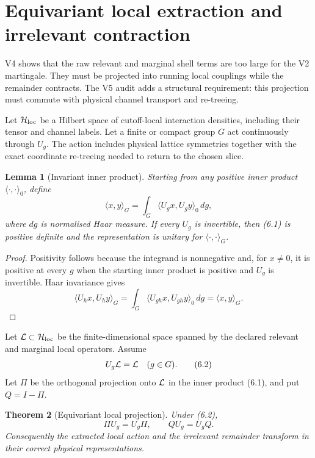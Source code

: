 \documentclass[11pt]{article}
\newtheorem{theorem}{Theorem}[section]
\newtheorem{lemma}[theorem]{Lemma}
\theoremstyle{remark}
\begin{document}
\section{Equivariant local extraction and irrelevant contraction}
\label{sec:v12v6}

V4 shows that the raw relevant and marginal shell terms are too large
for the V2 martingale.  They must be projected into running local
couplings while the remainder contracts.  The V5 audit adds a
structural requirement: this projection must commute with physical
channel transport and re-treeing.

Let \({\cal H}_{\rm loc}\) be a Hilbert space of cutoff-local
interaction densities, including their tensor and channel labels.
Let a finite or compact group \(G\) act continuously through
\(U_g\).  The action includes physical lattice symmetries together
with the exact coordinate re-treeing needed to return to the chosen
slice.

\begin{lemma}[Invariant inner product]
\label{lem:v12v6-average}
Starting from any positive inner product
\(\langle\cdot,\cdot\rangle_0\), define
\[
 \langle x,y\rangle_G
 =\int_G\langle U_gx,U_gy\rangle_0\,dg,                     \tag{6.1}
\]
where \(dg\) is normalised Haar measure.  If every \(U_g\) is
invertible, then (6.1) is positive definite and the representation is
unitary for \(\langle\cdot,\cdot\rangle_G\).
\end{lemma}

\begin{proof}
Positivity follows because the integrand is nonnegative and, for
\(x\ne0\), it is positive at every \(g\) when the starting inner
product is positive and \(U_g\) is invertible.  Haar invariance gives
\[
 \langle U_hx,U_hy\rangle_G
 =\int_G\langle U_{gh}x,U_{gh}y\rangle_0\,dg
 =\langle x,y\rangle_G.
\]
\end{proof}

Let \({\cal L}\subset{\cal H}_{\rm loc}\) be the finite-dimensional
space spanned by the declared relevant and marginal local operators.
Assume
\[
                              U_g{\cal L}={\cal L}
                         \quad(g\in G).                      \tag{6.2}
\]
Let \(\Pi\) be the orthogonal projection onto \({\cal L}\) in the
inner product (6.1), and put \(Q=I-\Pi\).

\begin{theorem}[Equivariant local projection]
\label{thm:v12v6-projection}
Under (6.2),
\[
                              \Pi U_g=U_g\Pi,\qquad
                              QU_g=U_gQ.                     \tag{6.3}
\]
Consequently the extracted local action and the irrelevant remainder
transform in their correct physical representations.
\end{theorem}
\end{document}
